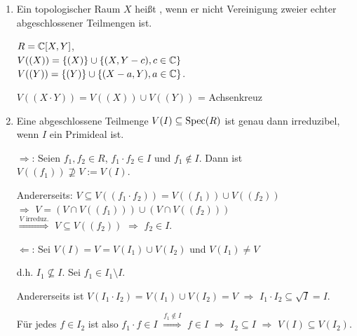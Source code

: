 \documentclass[a4paper, 10pt]{report}
\begin{document}
\begin{DefProp}

\begin{enumerate}
\item Ein topologischer Raum $X$ heißt , wenn er nicht Vereinigung zweier echter abgeschlossener Teilmengen ist.

\begin{nnBsp}
$R = \mathbb{C}[X,Y]$,\\
$V((X)) = \{ (X) \} \cup \{ (X, Y - c), c \in \mathbb{C} \}$\\
$V((Y)) = \{ (Y) \} \cup \{ (X -a, Y), a \in \mathbb{C} \}$.

$V((X \cdot Y)) = V( (X) ) \cup V( (Y) )$ = Achsenkreuz
\end{nnBsp}

\item Eine abgeschlossene Teilmenge $V(I) \subseteq \mathrm{Spec}(R)$ ist genau dann irreduzibel, wenn $I$ ein Primideal ist.

\begin{Bew}
\glqq$\Rightarrow$\grqq: Seien $f_1, f_2 \in R$, $f_1 \cdot f_2 \in I$ und $f_1 \notin I$. Dann ist $V((f_1)) \nsupseteq V := V(I)$.

Andererseits: $V \subseteq V((f_1 \cdot f_2)) = V((f_1)) \cup V((f_2))$\\
$\Rightarrow$ $V = (V \cap V((f_1))) \cup (V \cap V((f_2)))$\\
$\overset{V \text{ irreduz.}}\Rightarrow$ $V \subseteq V((f_2))$ $\Rightarrow$ $f_2 \in I$.

\glqq$\Leftarrow$\grqq: Sei $V(I) = V = V(I_1) \cup V(I_2)$ und $V(I_1) \neq V$

d.h. $I_1 \nsubseteq I$. Sei $f_1 \in I_1 \setminus I$.

Andererseits ist $V(I_1 \cdot I_2) = V(I_1) \cup V(I_2) = V$ $\Rightarrow$ $I_1 \cdot I_2 \subseteq \sqrt{I} = I$.

F\"ur jedes $f \in I_2$ ist also $f_1 \cdot f \in I$ $\overset{f_1 \notin I}\Rightarrow$ $f \in I$ $\Rightarrow$ $I_2 \subseteq I$ $\Rightarrow$ $V(I) \subseteq V(I_2)$.

\end{Bew}

\end{enumerate}

\end{DefProp}
\end{document}

